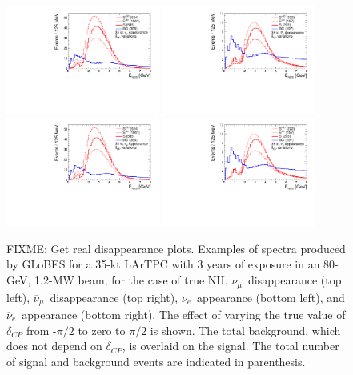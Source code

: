 \documentclass[letterpaper,11pt]{article}
\begin{document}
\begin{figure}[!htb]
  \centering
  \includegraphics[width=0.45\textwidth]{figs/spectra_35kt_nue_dcpvar.pdf}
  \includegraphics[width=0.45\textwidth]{figs/spectra_35kt_nuebar_dcpvar.pdf}
  \includegraphics[width=0.45\textwidth]{figs/spectra_35kt_nue_dcpvar.pdf}
  \includegraphics[width=0.45\textwidth]{figs/spectra_35kt_nuebar_dcpvar.pdf}
  \caption{FIXME: Get real disappearance plots.
  Examples of spectra produced by GLoBES for a 35-kt LArTPC with 3 years of 
  exposure in an 80-GeV, 1.2-MW beam, for the case of true NH. 
  $\nu_{\mu}$~disappearance (top left),
  $\overline{\nu}_{\mu}$~disappearance (top right), $\nu_e$~appearance (bottom left),
  and $\overline{\nu}_e$~appearance (bottom right). The effect of varying the true
  value of $\delta_{CP}$ from -$\pi/2$ to zero to $\pi/2$ is shown. The total background,
  which does not depend on $\delta_{CP}$, is overlaid on the signal. The total number
  of signal and background events are indicated in parenthesis.}
  \label{fig:example_spectra}
\end{figure}
\end{document}
